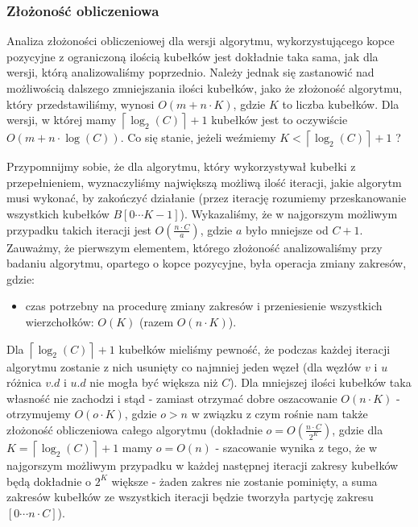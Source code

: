 \subsubsection{Złożoność obliczeniowa}

Analiza złożoności obliczeniowej dla wersji algorytmu, wykorzystującego kopce pozycyjne z ograniczoną ilością kubełków jest dokładnie taka sama, jak dla wersji, którą analizowaliśmy poprzednio. Należy jednak się zastanowić nad możliwością dalszego zmniejszania ilości kubełków, jako że złożoność algorytmu, który przedstawiliśmy, wynosi $ O \left( m + n \cdot K \right)$, gdzie $K$ to liczba kubełków. Dla wersji, w której mamy $ \left \lceil \log_{2} \left( C \right) \right \rceil + 1$ kubełków jest to oczywiście $ O \left( m + n \cdot \log \left( C \right) \right)$. Co się stanie, jeżeli weźmiemy $K < \left \lceil \log_{2} \left( C \right) \right \rceil + 1$ ?

Przypomnijmy sobie, że dla algorytmu, który wykorzystywał kubełki z przepełnieniem, wyznaczyliśmy największą możliwą ilość iteracji, jakie algorytm musi wykonać, by zakończyć działanie (przez iterację rozumiemy przeskanowanie wszystkich kubełków $B \left[ 0 \cdots K - 1\right]$). Wykazaliśmy, że w najgorszym możliwym przypadku takich iteracji jest $ O \left( \frac{n \cdot C}{a} \right)$, gdzie $a$ było mniejsze od $C + 1$. Zauważmy, że pierwszym elementem, którego złożoność analizowaliśmy przy badaniu algorytmu, opartego o kopce pozycyjne, była operacja zmiany zakresów, gdzie:

\begin{itemize}
\item czas potrzebny na procedurę zmiany zakresów i przeniesienie wszystkich wierzchołków: $ O \left( K \right)$ (razem $ O \left( n \cdot K \right)$).
\end{itemize}

Dla $ \left \lceil \log_{2} \left( C \right) \right \rceil + 1$ kubełków mieliśmy pewność, że podczas każdej iteracji algorytmu zostanie z nich usunięty co najmniej jeden węzeł (dla węzłów $v$ i $u$ różnica $v.d$ i $u.d$ nie mogła być większa niż $C$). Dla mniejszej ilości kubełków taka własność nie zachodzi i stąd - zamiast otrzymać dobre oszacowanie $ O \left( n \cdot K \right)$ - otrzymujemy $ O \left( o \cdot K \right)$, gdzie $o > n $ w związku z czym rośnie nam także złożoność obliczeniowa całego algorytmu (dokładnie $o = O \left( \frac{n \cdot C}{2^{K}}\right)$, gdzie dla $K = \left \lceil \log_{2} \left( C \right) \right \rceil + 1$ mamy $o = O \left( n \right)$ - szacowanie wynika z tego, że w najgorszym możliwym przypadku w każdej następnej iteracji zakresy kubełków będą dokładnie o $2^{K}$ większe - żaden zakres nie zostanie pominięty, a suma zakresów kubełków ze wszystkich iteracji będzie tworzyła partycję zakresu $\left[ 0 \cdots n \cdot C \right]$).